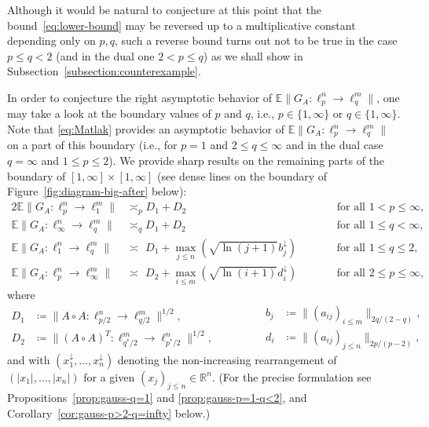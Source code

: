 \documentclass[a4paper]{amsart}
\theoremstyle{definition}
\theoremstyle{remark}
\numberwithin{equation}{section}
\newcommand*{\RR}{\mathbb{R}}
\newcommand*{\EE}{\mathbb{E}}
\newcommand*{\hadprod}{\mathbin{\circ}} %
\newcommand*{\rearr}{\downarrow} %
\begin{document}
Although it would be natural to conjecture at this point that the bound~\eqref{eq:lower-bound} may be reversed up to a multiplicative constant depending only on $p,q$, such a reverse bound turns out not to be true in the case $p\le q< 2$ (and in the dual one $2< p\le q$) as we shall show in Subsection~\ref{subsection:counterexample}. 


In order to conjecture the right asymptotic behavior of $\EE\|G_A\colon \ell_p^n \to \ell_q^m\|$, one may take a look at the boundary values of $p$ and $q$,
i.e., $p\in \{1,\infty \}$ or $q\in \{1, \infty \}$. Note that \eqref{eq:Matlak} provides an asymptotic behavior of $\EE\|G_A\colon \ell_p^n \to \ell_q^m\|$ on a part of this boundary 
(i.e., for $p=1$ and $2\le q\le \infty$ and in the dual case $q=\infty$ and $1\le p\le 2$). We provide sharp results on the remaining parts of the boundary of $[1,\infty]\times[1,\infty]$ (see dense lines on the boundary of Figure~\ref{fig:diagram-big-after} below):
			\begin{alignat*}{2}
			\EE \|G_A \colon \ell^n_p\to \ell^m_1\|	&\asymp_{p}
			D_1 +D_2 &&\qquad \text{for all }1<p\le \infty,
			\\
			\EE \|G_A \colon \ell^n_\infty\to \ell^m_q\|	&\asymp_{q}
			D_1 +D_2 &&\qquad \text{for all }1\le q<\infty,\\
			\EE \|G_A \colon \ell^n_1\to \ell^m_q\|	&\asymp_{\phantom{r}} D_1 + \max_{j\le n} (\sqrt{\ln(j+1)} b_j^{\rearr{}})	&&\qquad \text{for all }1\le q\leq 2,
			\\
			\EE \|G_A\colon \ell_p^n \to \ell_\infty^m\| &\asymp_{\phantom{r}} D_2+ \max_{i\le m} (\sqrt{\ln(i+1)} d_i^{\rearr{}}) &&\qquad \text{for all }2\leq p\le \infty,
			\end{alignat*}
			where 
		\begin{equation*}
\begin{split}
D_1  &\coloneqq \|A\hadprod A \colon \ell^n_{p/2} \to \ell^m_{q/2}\|^{1/2},\\
D_2  &\coloneqq \|(A\hadprod A)^T \colon \ell^m_{q^*/2} \to \ell^n_{p^*/2}\|^{1/2},
\end{split}
\qquad\qquad
\begin{split}
b_j&\coloneqq \|(a_{ij})_{i\le m} \|_{2q/(2-q)}, \\
d_i &\coloneqq \|(a_{ij})_{j\le n} \|_{2p/(p-2)},
\end{split}
\end{equation*}
and with $(x_1^{\rearr{}}, \ldots,x_n^{\rearr{}})$ denoting 
the non-increasing rearrangement of $(|x_1|,\ldots, |x_n|)$ for a given $(x_j)_{j\le n}\in\RR^n$.
(For the precise formulation see Propositions~\ref{prop:gauss-q=1} and \ref{prop:gauss-p=1-q<2}, and Corollary~\ref{cor:gauss-p>2-q=infty} below.)
\end{document}
